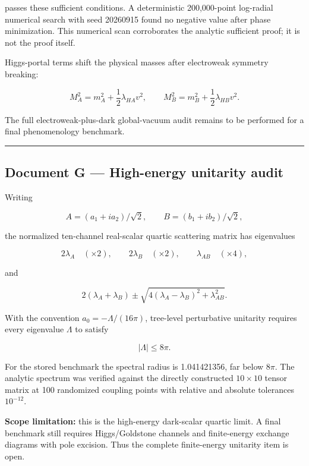 \documentclass[
]{article}
\begin{document}
passes these sufficient conditions. A deterministic 200,000-point
log-radial numerical search with seed 20260915 found no negative value
after phase minimization. This numerical scan corroborates the analytic
sufficient proof; it is not the proof itself.

Higgs-portal terms shift the physical masses after electroweak symmetry
breaking:

\[
M_A^2=m_A^2+\frac12\lambda_{HA}v^2,\qquad
M_B^2=m_B^2+\frac12\lambda_{HB}v^2.
\]

The full electroweak-plus-dark global-vacuum audit remains to be
performed for a final phenomenology benchmark.

\begin{center}\rule{0.5\linewidth}{0.5pt}\end{center}

\hypertarget{document-g-high-energy-unitarity-audit}{%
\subsection{Document G --- High-energy unitarity
audit}\label{document-g-high-energy-unitarity-audit}}

Writing

\[
A=(a_1+ia_2)/\sqrt2,\qquad B=(b_1+ib_2)/\sqrt2,
\]

the normalized ten-channel real-scalar quartic scattering matrix has
eigenvalues

\[
2\lambda_A\quad(\times2),\qquad
2\lambda_B\quad(\times2),\qquad
\lambda_{AB}\quad(\times4),
\]

and

\[
2(\lambda_A+\lambda_B)
\pm\sqrt{4(\lambda_A-\lambda_B)^2+\lambda_{AB}^2}.
\]

With the convention \(a_0=-\Lambda/(16\pi)\), tree-level perturbative
unitarity requires every eigenvalue \(\Lambda\) to satisfy

\[
|\Lambda|\le8\pi.
\]

For the stored benchmark the spectral radius is 1.041421356, far below
\(8\pi\). The analytic spectrum was verified against the directly
constructed \(10\times10\) tensor matrix at 100 randomized coupling
points with relative and absolute tolerances \(10^{-12}\).

\textbf{Scope limitation:} this is the high-energy dark-scalar quartic
limit. A final benchmark still requires Higgs/Goldstone channels and
finite-energy exchange diagrams with pole excision. Thus the complete
finite-energy unitarity item is open.
\end{document}
